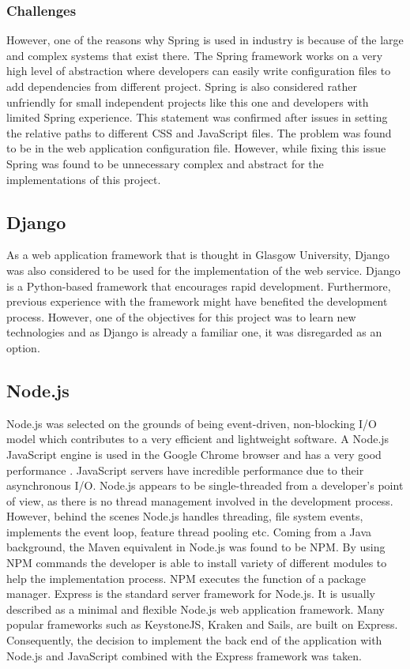 \documentclass{l4proj}
\begin{document}
\subsubsection{Challenges}

However, one of the reasons why Spring is used in industry is because of the large and complex systems that exist there. The Spring framework works on a very high level of abstraction where developers can easily write configuration files to add dependencies from different project. Spring is also considered rather unfriendly for small independent projects like this one and developers with limited Spring experience. This statement was confirmed after issues in setting the relative paths to different CSS and JavaScript files. The problem was found to be in the web application configuration file. However, while fixing this issue Spring was found to be unnecessary complex and abstract for the implementations of this project.

\subsection{Django}

As a web application framework that is thought in Glasgow University, Django was also considered to be used for the implementation of the web service. Django is a Python-based framework that encourages rapid development. Furthermore, previous experience with the framework might have benefited the development process. However, one of the objectives for this project was to learn new technologies and as Django is already a familiar one, it was disregarded as an option.

\subsection{Node.js}

Node.js was selected on the grounds of being event-driven, non-blocking I/O model which contributes to a very efficient and lightweight software. A Node.js JavaScript engine is used in the Google Chrome browser and has a very good performance \cite{tilkov2010node}. JavaScript servers have incredible performance due to their asynchronous I/O. Node.js appears to be single-threaded from a developer's point of view, as there is no thread management involved in the development process. However, behind the scenes Node.js handles threading, file system events, implements the event loop, feature thread pooling etc. Coming from a Java background, the Maven equivalent in Node.js was found to be NPM. By using NPM commands the developer is able to install variety of different modules to help the implementation process. NPM executes the function of a package manager. Express is the standard server framework for Node.js. It is usually described as a minimal and flexible Node.js web application framework. Many popular frameworks such as KeystoneJS, Kraken and Sails, are built on Express. Consequently, the decision to implement the back end of the application with Node.js and JavaScript combined with the Express framework was taken.
\end{document}
